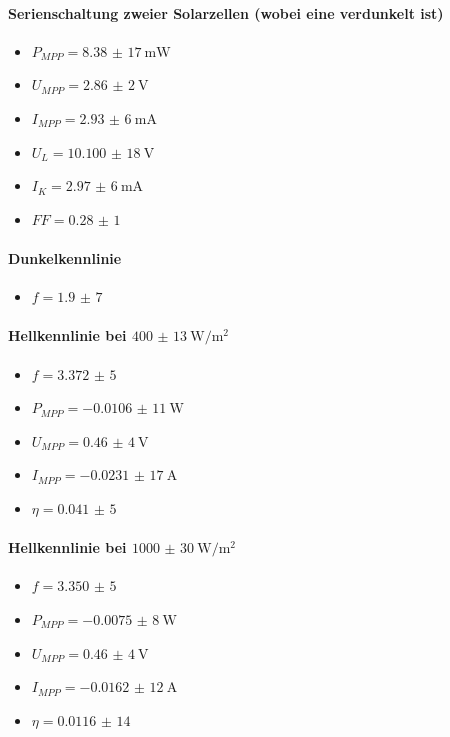 \documentclass[english, ngerman]{scrartcl}
\begin{document}
\paragraph{Serienschaltung zweier Solarzellen (wobei eine verdunkelt ist)}
\begin{itemize}
    \item $P_{MPP} = \SI{8,38(17)}{\milli\watt}$
    \item $U_{MPP} = \SI{2,86(2)}{\volt}$
    \item $I_{MPP} = \SI{2,93(6)}{\milli\ampere}$
    \item $U_{L} = \SI{10,100(18)}{\volt}$
    \item $I_{K} = \SI{2,97(6)}{\milli\ampere}$
    \item $FF = \num{0,28(1)}$
\end{itemize}

\paragraph{Dunkelkennlinie}
\begin{itemize}
    \item $f = \num{1,9(7)}$
\end{itemize}
\paragraph{Hellkennlinie bei $\SI{400(13)}{\watt\per\square\meter}$}
\begin{itemize}
    \item $f = \num{3,372(5)}$
    \item $P_{MPP} = \SI{-0,0106(11)}{\watt}$
    \item $U_{MPP} = \SI{0,46(4)}{\volt}$
    \item $I_{MPP} = \SI{-0,0231(17)}{\ampere}$
    \item $\eta = \num{0,041(5)}$
\end{itemize}
\paragraph{Hellkennlinie bei $\SI{1000(30)}{\watt\per\square\meter}$}
\begin{itemize}
    \item $f = \num{3,350(5)}$
    \item $P_{MPP} = \SI{-0,0075(8)}{\watt}$
    \item $U_{MPP} = \SI{0,46(4)}{\volt}$
    \item $I_{MPP} = \SI{-0,0162(12)}{\ampere}$
    \item $\eta = \num{0,0116(14)}$
\end{itemize}
\end{document}
